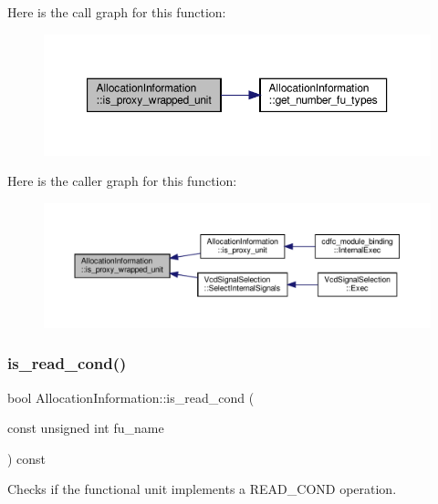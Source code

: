 Here is the call graph for this function\+:
\nopagebreak
\begin{figure}[H]
\begin{center}
\leavevmode
\includegraphics[width=350pt]{d7/d79/classAllocationInformation_a64b03e943913927efd6cfb97feaf0e47_cgraph}
\end{center}
\end{figure}
Here is the caller graph for this function\+:
\nopagebreak
\begin{figure}[H]
\begin{center}
\leavevmode
\includegraphics[width=350pt]{d7/d79/classAllocationInformation_a64b03e943913927efd6cfb97feaf0e47_icgraph}
\end{center}
\end{figure}
\mbox{\label{classAllocationInformation_ace7726c3d3d4f4115a8c38a7a4f5aa9c}} 
\subsubsection{\texorpdfstring{is\+\_\+read\+\_\+cond()}{is\_read\_cond()}}
{\footnotesize\ttfamily bool Allocation\+Information\+::is\+\_\+read\+\_\+cond (\begin{DoxyParamCaption}\item[{const unsigned int}]{fu\+\_\+name }\end{DoxyParamCaption}) const}



Checks if the functional unit implements a R\+E\+A\+D\+\_\+\+C\+O\+ND operation. 



